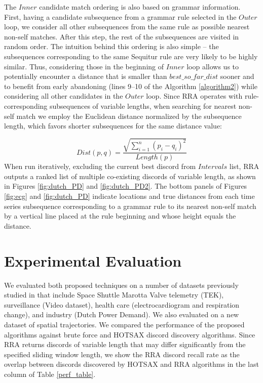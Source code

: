 \documentclass{sig-alternate}
\begin{document}
The $Inner$ candidate match ordering is also based on grammar information. First, having a candidate subsequence from a grammar rule selected in the $Outer$ loop, we consider all other subsequences from the same rule as possible nearest non-self matches. After this step, the rest of the subsequences are visited in  random order. The intuition behind this ordering is also simple -- the subsequences corresponding to the same Sequitur rule are very likely to be highly similar. Thus, considering those in the beginning of $Inner$ loop allows us to potentially encounter a distance that is smaller than $best\_so\_far\_dist$ sooner and to benefit from early abandoning (lines 9--10 of the Algorithm \ref{algorithm2}) while considering all other candidates in the $Outer$ loop. Since RRA operates with rule-corresponding subsequences of variable lengths, when searching for nearest non-self match we employ the Euclidean distance normalized by the subsequence length, which favors shorter subsequences for the same distance value: 

\begin{equation}
  Dist(p,q) = \frac{\sqrt{\sum_{i=1}^n (p_i-q_i)^2}}{Length(p)} \label{dist}
\end{equation}
When run iteratively, excluding the current best discord from $Intervals$ list, RRA outputs a ranked list of multiple co-existing discords of variable length, as shown in Figures \ref{fig:dutch_PD} and \ref{fig:dutch_PD2}. The bottom panels of Figures \ref{fig:ecg} and \ref{fig:dutch_PD} indicate locations and true distances from each time series subsequence corresponding to a grammar rule to its nearest non-self match by a vertical line placed at the rule beginning and whose height equals the distance.
\vspace{1em}
\section{Experimental Evaluation}\label{evaluation}
We evaluated both proposed techniques on a number of datasets previously studied in \cite{hot_sax} that include Space Shuttle Marotta Valve telemetry (TEK), surveillance (Video data\-set), health care (electrocardiogram and respiration change), and industry (Dutch Power Demand).  We also evaluated on a new dataset of spatial trajectories.  We compared the performance of the proposed algorithms against brute force and HOTSAX \cite{hot_sax} discord discovery algorithms. Since RRA returns discords of variable length that may differ significantly from the specified sliding window length, we show the RRA discord recall rate as the overlap between discords discovered by HOTSAX and RRA algorithms in the last column of Table \ref{perf_table}. 
\end{document}
